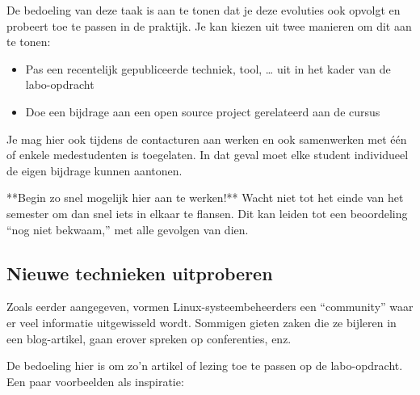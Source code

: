 De bedoeling van deze taak is aan te tonen dat je deze evoluties ook opvolgt en probeert toe te passen in de praktijk. Je kan kiezen uit twee manieren om dit aan te tonen:

\begin{itemize}
\item Pas een recentelijk gepubliceerde techniek, tool, \ldots{} uit in het kader van de labo-opdracht
\item Doe een bijdrage aan een open source project gerelateerd aan de cursus
\end{itemize}

Je mag hier ook tijdens de contacturen aan werken en ook samenwerken met één of enkele medestudenten is toegelaten. In dat geval moet elke student individueel de eigen bijdrage kunnen aantonen.

**Begin zo snel mogelijk hier aan te werken!** Wacht niet tot het einde van het semester om dan snel iets in elkaar te flansen. Dit kan leiden tot een beoordeling ``nog niet bekwaam,'' met alle gevolgen van dien.

\subsection{Nieuwe technieken uitproberen}
\label{nieuwe-technieken-uitproberen}

Zoals eerder aangegeven, vormen Linux-systeembeheerders een ``community'' waar er veel informatie uitgewisseld wordt. Sommigen gieten zaken die ze bijleren in een blog-artikel, gaan erover spreken op conferenties, enz.

De bedoeling hier is om zo'n artikel of lezing toe te passen op de labo-opdracht. Een paar voorbeelden als inspiratie:

